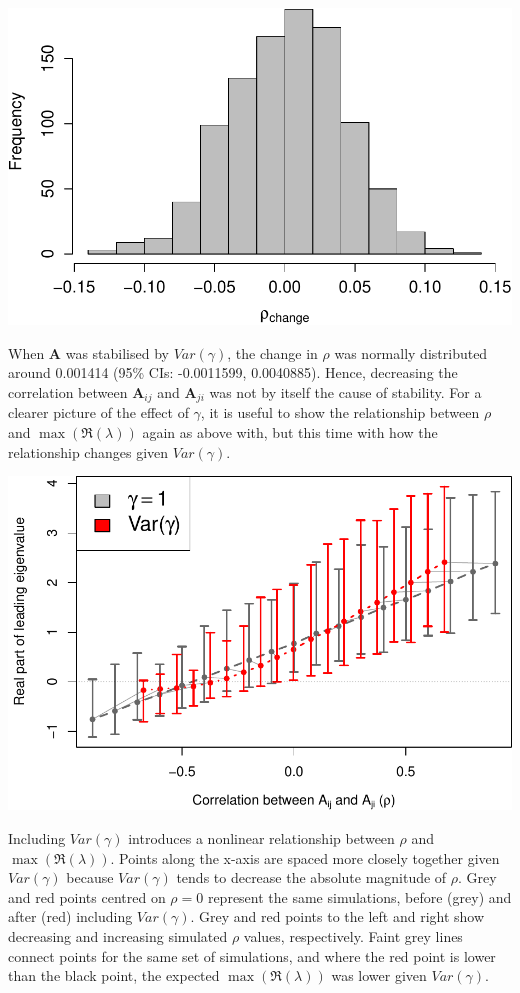 \documentclass[]{article}
\begin{document}
\includegraphics{revision_notes_files/figure-latex/unnamed-chunk-7-1.pdf}

When \(\textbf{A}\) was stabilised by \(Var(\gamma)\), the change in
\(\rho\) was normally distributed around 0.001414 (95\% CIs: -0.0011599,
0.0040885). Hence, decreasing the correlation between
\(\textbf{A}_{ij}\) and \(\textbf{A}_{ji}\) was not by itself the cause
of stability. For a clearer picture of the effect of \(\gamma\), it is
useful to show the relationship between \(\rho\) and
\(\max(\Re(\lambda))\) again as above with, but this time with how the
relationship changes given \(Var(\gamma)\).

\includegraphics{revision_notes_files/figure-latex/unnamed-chunk-8-1.pdf}

Including \(Var(\gamma)\) introduces a nonlinear relationship between
\(\rho\) and \(\max(\Re(\lambda))\). Points along the x-axis are spaced
more closely together given \(Var(\gamma)\) because \(Var(\gamma)\)
tends to decrease the absolute magnitude of \(\rho\). Grey and red
points centred on \(\rho = 0\) represent the same simulations, before
(grey) and after (red) including \(Var(\gamma)\). Grey and red points to
the left and right show decreasing and increasing simulated \(\rho\)
values, respectively. Faint grey lines connect points for the same set
of simulations, and where the red point is lower than the black point,
the expected \(\max(\Re(\lambda))\) was lower given \(Var(\gamma)\).
\end{document}
